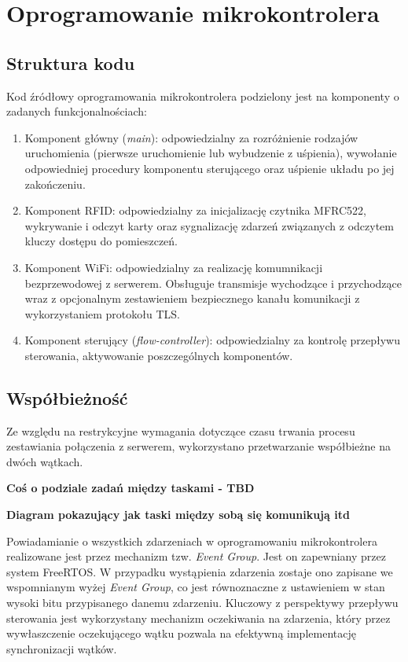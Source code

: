         \section{Oprogramowanie mikrokontrolera}

            \subsection{Struktura kodu}
                Kod źródłowy oprogramowania mikrokontrolera podzielony jest na komponenty o zadanych funkcjonalnościach:
                \begin{enumerate}
                    \item Komponent główny (\textit{main}): odpowiedzialny za rozróżnienie rodzajów uruchomienia (pierwsze uruchomienie lub wybudzenie z uśpienia), wywołanie odpowiedniej procedury komponentu sterującego oraz uśpienie układu po jej zakończeniu.
                    \item Komponent RFID: odpowiedzialny za inicjalizację czytnika MFRC522, wykrywanie i odczyt karty oraz sygnalizację zdarzeń związanych z odczytem kluczy dostępu do pomieszczeń.
                    \item Komponent WiFi: odpowiedzialny za realizację komumnikacji bezprzewodowej z serwerem. Obsługuje transmisje wychodzące i przychodzące wraz z opcjonalnym zestawieniem bezpiecznego kanału komunikacji z wykorzystaniem protokołu TLS.
                    \item Komponent sterujący (\textit{flow-controller}): odpowiedzialny za kontrolę przepływu sterowania, aktywowanie poszczególnych komponentów.
                \end{enumerate}

            \subsection{Współbieżność}
                Ze względu na restrykcyjne wymagania dotyczące czasu trwania procesu zestawiania połączenia z serwerem, wykorzystano przetwarzanie współbieżne na dwóch wątkach.

                \textbf{Coś o podziale zadań między taskami - TBD}

                \textbf{Diagram pokazujący jak taski między sobą się komunikują itd}

                Powiadamianie o wszystkich zdarzeniach w oprogramowaniu mikrokontrolera realizowane jest przez mechanizm tzw. \textit{Event Group}. Jest on zapewniany przez system FreeRTOS. W przypadku wystąpienia zdarzenia zostaje ono zapisane we wspomnianym wyżej \textit{Event Group}, co jest równoznaczne z ustawieniem w stan wysoki bitu przypisanego danemu zdarzeniu. Kluczowy z perspektywy przepływu sterowania jest wykorzystany mechanizm oczekiwania na zdarzenia, który przez wywłaszczenie oczekującego wątku pozwala na efektywną implementację synchronizacji wątków.

